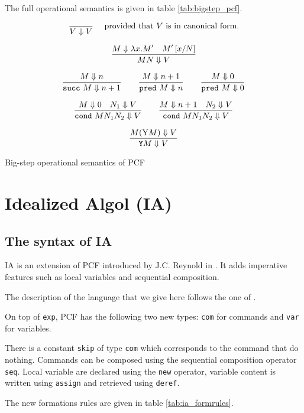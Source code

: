 The full operational semantics is given in table \ref{tab:bigstep_pcf}.

\begin{table}[htbp]
$$\frac{\displaystyle }{V \Downarrow V} \quad \mbox{ provided that $V$ is in canonical form.} $$

$$ \frac{\displaystyle M \Downarrow \lambda x. M' \quad M'\left[ x/N \right]}{M N \Downarrow V}$$

$$\frac{\displaystyle M \Downarrow n}{\texttt{succ}\ M \Downarrow n+1}
\qquad \frac{\displaystyle M \Downarrow n+1}{\texttt{pred}\ M \Downarrow n}
\qquad \frac{\displaystyle M \Downarrow 0}{\texttt{pred}\ M \Downarrow 0}$$

$$\frac{\displaystyle M \Downarrow 0 \quad N_1 \Downarrow V}{\texttt{cond}\ M N_1 N_2  \Downarrow V}
\qquad
 \frac{\displaystyle M \Downarrow n+1 \quad N_2 \Downarrow V}{\texttt{cond}\ M N_1 N_2  \Downarrow V}$$

$$\frac{\displaystyle M (\mathrm{Y} M) \Downarrow V }{\texttt{Y} M \Downarrow V}$$
\label{tab:bigstep_pcf}
\caption{Big-step operational semantics of PCF}
\end{table}



\section{Idealized Algol (IA)}
\label{sec:ia}

\subsection{The syntax of IA}
IA is an extension of PCF introduced by J.C. Reynold in
\cite{Reynolds81}. It adds imperative features such as local variables and sequential composition.

The description of the language that we give here follows the one of \cite{abramsky:game-semantics}.

On top of \texttt{exp}, PCF has the following two new types:
 \texttt{com} for commands and \texttt{var} for variables.

There is a constant \texttt{skip} of type \texttt{com} which corresponds to the command that do
nothing. Commands can be composed using the sequential composition operator \texttt{seq}.
Local variable are declared using the \texttt{new} operator, variable content is written
using \texttt{assign} and retrieved using \texttt{deref}.

The new formations rules are given in table \ref{tab:ia_formrules}.


